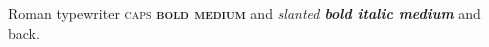 \documentclass{article}
\begin{document}
Roman {\ttfamily typewriter {\scshape caps \bfseries bold \mdseries medium} and
{\slshape slanted \bfseries bold \itshape italic \mdseries medium}} and back.
\end{document}
